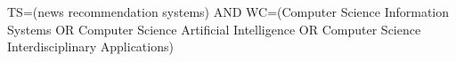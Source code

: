 TS=(news recommendation systems) AND WC=(Computer Science Information Systems OR Computer Science Artificial Intelligence OR Computer Science Interdisciplinary Applications)